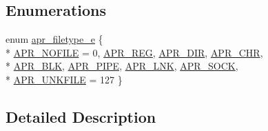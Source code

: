 \subsection*{Enumerations}
\begin{DoxyCompactItemize}
\item 
enum \hyperlink{group__apr__file__info_gae3f0ce3014337a52b39852f8bf81ca7c}{apr\-\_\-filetype\-\_\-e} \{ \\*
\hyperlink{group__apr__file__info_ggae3f0ce3014337a52b39852f8bf81ca7cae5877c29ba5fd483edbde0c51c0ac5e9}{A\-P\-R\-\_\-\-N\-O\-F\-I\-L\-E} = 0, 
\hyperlink{group__apr__file__info_ggae3f0ce3014337a52b39852f8bf81ca7ca9a2849ad21618c937683c1ffe13a6257}{A\-P\-R\-\_\-\-R\-E\-G}, 
\hyperlink{group__apr__file__info_ggae3f0ce3014337a52b39852f8bf81ca7cae2ee810fa994ae64b8fcc6b68d3ae540}{A\-P\-R\-\_\-\-D\-I\-R}, 
\hyperlink{group__apr__file__info_ggae3f0ce3014337a52b39852f8bf81ca7cadb769ffbe8659cbecf7ebf376d098d37}{A\-P\-R\-\_\-\-C\-H\-R}, 
\\*
\hyperlink{group__apr__file__info_ggae3f0ce3014337a52b39852f8bf81ca7ca20ea6a09a69785a7cd19fd05243c1c8d}{A\-P\-R\-\_\-\-B\-L\-K}, 
\hyperlink{group__apr__file__info_ggae3f0ce3014337a52b39852f8bf81ca7ca247719668cd02286a6a0ed767c30ce77}{A\-P\-R\-\_\-\-P\-I\-P\-E}, 
\hyperlink{group__apr__file__info_ggae3f0ce3014337a52b39852f8bf81ca7ca2b55a6db64d814bf08d5a56b026a8176}{A\-P\-R\-\_\-\-L\-N\-K}, 
\hyperlink{group__apr__file__info_ggae3f0ce3014337a52b39852f8bf81ca7cadd5d86c1e616fe159a7ec04e0ddc70db}{A\-P\-R\-\_\-\-S\-O\-C\-K}, 
\\*
\hyperlink{group__apr__file__info_ggae3f0ce3014337a52b39852f8bf81ca7ca3347d2110d62ce464ddf1ae38759e6b0}{A\-P\-R\-\_\-\-U\-N\-K\-F\-I\-L\-E} = 127
 \}
\end{DoxyCompactItemize}


\subsection{Detailed Description}



